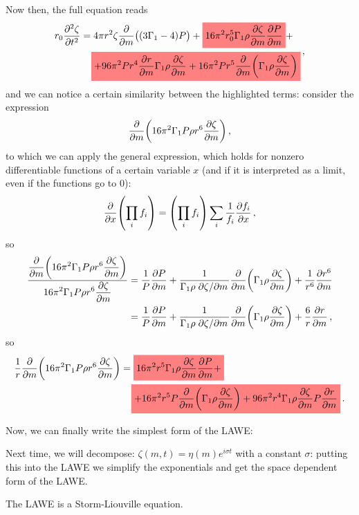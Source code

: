 \documentclass[main.tex]{subfiles}
\begin{document}
Now then, the full equation reads 
%
\begin{align}
\begin{split}
r_0 \pdv[2]{\zeta }{t} &= 
4 \pi r^2 \zeta \pdv{}{m} \qty((3\Gamma_1 -4) P) 
+ \hlc{red}{16 \pi^2 r_0^5 \Gamma_1 \rho \pdv{\zeta }{m} \pdv{P}{m}} + \\
&\phantom{=}\ 
\hlc{red}{+ 96 \pi^2 P r^4 \pdv{r}{m} \Gamma_1 \rho \pdv{\zeta }{m}
+ 16 \pi^2 P r^5 \pdv{}{m} \qty(\Gamma_1 \rho \pdv{\zeta }{m})}
\end{split}
\,,
\end{align}
%
and we can notice a certain similarity between the highlighted terms: consider the expression 
%
\begin{align}
\pdv{}{m} \qty(16 \pi^2 \Gamma_1 P \rho r^{6} \pdv{\zeta }{m})
\,,
\end{align}
to which we can apply the general expression, which holds for nonzero differentiable functions of a certain variable \(x\) (and if it is interpreted as a limit, even if the functions go to 0): 
%
\begin{align}
\pdv{}{x} \qty(\prod_i f_i) 
= \qty(\prod_i f_i) \sum_i \frac{1}{f_i} \pdv{f_i}{x}
\,,
\end{align}
%
so 
%
\begin{align}
\frac{\displaystyle\pdv{}{m} \qty(16 \pi^2 \Gamma_1 P \rho r^{6} \pdv{\zeta }{m})}{\displaystyle 16 \pi^2 \Gamma_1 P \rho r^{6} \pdv{\zeta }{m}} &= 
\frac{1}{P} \pdv{P}{m} 
+ \frac{1}{\Gamma_1 \rho \pdv*{\zeta }{m}} \pdv{}{m} \qty(\Gamma_1 \rho \pdv{\zeta }{m})
+ \frac{1}{r^{6}} \pdv{r^{6}}{m}  \\
&= \frac{1}{P} \pdv{P}{m} 
+ \frac{1}{\Gamma_1 \rho \pdv*{\zeta }{m}} \pdv{}{m} \qty(\Gamma_1 \rho \pdv{\zeta }{m})
+ \frac{6}{r} \pdv{r}{m} 
\,,
\end{align}
%
so 
%
\begin{align}
\begin{split}
\frac{1}{r} \pdv{}{m} \qty(16 \pi^2 \Gamma_1 P \rho r^{6} \pdv{\zeta }{m}) &= 
\hlc{red}{16 \pi^2 r^{5} \Gamma_1 \rho \pdv{\zeta }{m} \pdv{P}{m} +} \\
&\phantom{=}\ 
\hlc{red}{+ 16 \pi^2 r^{5} P \pdv{}{m} \qty(\Gamma_1 \rho \pdv{\zeta }{m}) + 96 \pi^2r^{4} \Gamma_1 \rho \pdv{\zeta }{m} P \pdv{r}{m}}
\,.
\end{split}
\end{align}

Now, we can finally write the simplest form of the LAWE:
%
\boxalign{
\begin{align}
r \pdv[2]{\zeta}{t} =
4 \pi r^2 \zeta \pdv{}{m} \qty((3 \Gamma_1 - 4)P)+
\frac{1}{r} \pdv{}{m} \qty(16 \pi^2 \Gamma_1 P \rho r^6 \pdv{\zeta}{m} )  
\,,
\end{align}}
%

Next time, we will decompose: \(\zeta(m, t) = \eta(m) e^{i \sigma t}\) with a constant \(\sigma\): putting this into the LAWE we simplify the exponentials and get the space dependent form of the LAWE.

The LAWE is a Storm-Liouville equation.
\end{document}
